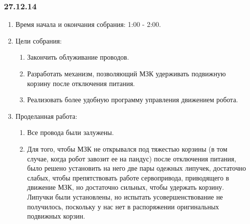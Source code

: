 \subsubsection{27.12.14}
\begin{enumerate}
	
	\item Время начала и окончания собрания: 1:00 - 2:00.
	
	\item Цели собрания: 
	\begin{enumerate}
		
		\item Закончить облуживание проводов.
		
		\item Разработать механизм, позволяющий МЗК удерживать подвижную корзину после отключения питания.
		
        \item Реализовать более удобную программу управления движением робота.
		
	\end{enumerate}

	\item Проделанная работа:
	\begin{enumerate}
		
		\item Все провода были залужены.
		
		\item Для того, чтобы МЗК не открывался под тяжестью корзины (в том случае, когда робот завозит ее на пандус) после отключения питания, было решено установить на него две пары одежных липучек, достаточно слабых, чтобы препятствовать работе сервопривода, приводящего в движение МЗК, но достаточно сильных, чтобы удержать корзину. Липучки были установлены, но испытать усовершенствование не получилось, поскольку у нас нет в распоряжении оригинальных подвижных корзин.
		

\end{enumerate}
\end{enumerate}
